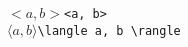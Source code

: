 \documentclass[crop]{standalone}
\begin{document}
\noindent
$<a, b>$\hfill\verb|<a, b>|\\[12pt]
\noindent
$\langle a, b \rangle$\hfill\verb|\langle a, b \rangle|
\end{document}
